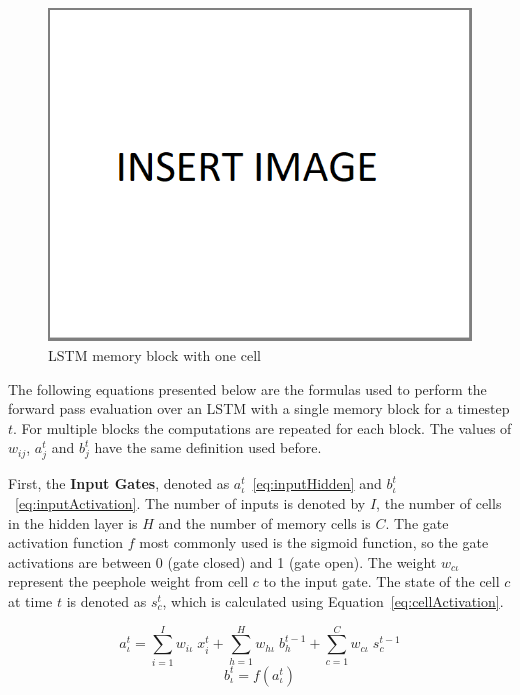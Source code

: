 \begin{figure}[!h]
    \centering
    \includegraphics[scale=.45]{imagenes/insertImage.png}
    \caption{LSTM memory block with one cell}
    \label{fig:oneCellLSTM}
\end{figure}

The following equations presented below are the formulas used to perform the forward pass 
evaluation over an LSTM with a single memory block for a timestep $t$. For multiple blocks 
the computations are repeated for each block. The values of $w_{ij}$, $a_j^t$ and $b_j^t$ 
have the same definition used before. 

First, the \textbf{Input Gates}, denoted as $a_\iota^t$~\ref{eq:inputHidden} and 
$b_\iota^t$~\ref{eq:inputActivation}. The number of inputs 
is denoted by $I$, the number of cells in the hidden layer is $H$ and the number of memory 
cells is $C$. The gate activation function $f$ most commonly used is the sigmoid function, so 
the gate activations are between 0 (gate closed) and 1 (gate open). The weight $w_{c\iota}$ 
represent the peephole weight from cell $c$ to the input gate. The state of the cell $c$ at 
time $t$ is denoted as $s_c^t$, which is calculated using Equation~\ref{eq:cellActivation}.

\begin{equation} \label{eq:inputHidden}
    a_\iota^t = \sum_{i=1}^I w_{i\iota} \; x_i^t + \sum_{h=1}^H w_{h\iota} \; b_h^{t-1} + \sum_{c=1}^C w_{c\iota} \; s_c^{t-1}
\end{equation}
\begin{equation} \label{eq:inputActivation}
    b_\iota^t = f(a_\iota^t)
\end{equation}


